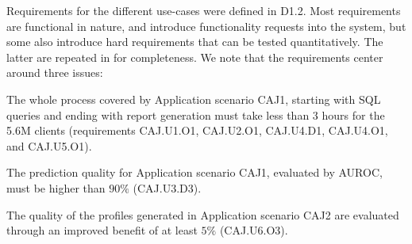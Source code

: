 \documentclass{article}
\theoremstyle{theorem}
\theoremstyle{definition}
\begin{document}
Requirements for the different use-cases were defined in D1.2. Most requirements are functional in nature, and introduce functionality requests into the system, but some also introduce hard requirements that can be tested quantitatively. The latter are repeated in  for completeness. We note that the requirements center around three issues:
\ben
\item The whole process covered by Application scenario CAJ1, starting with SQL queries and ending with report generation must take less than 3 hours for the 5.6M clients (requirements CAJ.U1.O1, CAJ.U2.O1, CAJ.U4.D1, CAJ.U4.O1, and CAJ.U5.O1).
\item The prediction quality for Application scenario CAJ1, evaluated by AUROC, must be higher than $90\%$ (CAJ.U3.D3).
\item The quality of the profiles generated in Application scenario CAJ2 are evaluated through an improved benefit of at least $5\%$ (CAJ.U6.O3).
\een

\begin{table}
\caption{Testable requirements for the Cajamar use-case. }\label{tab:cajamar:requirements}
\end{table}
\end{document}

